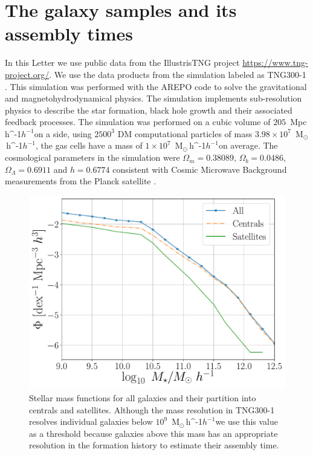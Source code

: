 \documentclass[fleqn,usenatbib]{mnras}
\newcommand{\Msunh}{\,{\rm M}$_{\odot}$\,\ifmmode h^{-1}\else $h^{-1}$\fi}
\newcommand{\Mpch}{\,{\rm Mpc}\,\ifmmode h^{-1}\else $h^{-1}$\fi}
\begin{document}
\section{The galaxy samples and its assembly times}
\label{sec:simul} 

In this Letter we use public data from the IllustrisTNG project
\url{https://www.tng-project.org/}. 
We use the data products from the simulation labeled as TNG300-1 
\citep{2019ComAC...6....2N}.
This simulation was performed with the AREPO code
\citep{2010MNRAS.401..791S} to solve the 
gravitational and magnetohydrodynamical physics. 
The simulation implements sub-resolution physics to describe the
star formation, black hole growth and their associated feedback
processes. 
The simulation was performed on a cubic volume of $205$ \Mpch on a
side, using  $2500^3$ DM computational particles of mass $3.98 \times
10^7$ \Msunh, the gas cells have a mass of $1 \times 10^7$ \Msunh on
average.
The cosmological parameters in the simulation were $\Omega_m=0.38089$,
$\Omega_b=0.0486$, $\Omega_\Lambda= 0.6911$ and $h=0.6774$ consistent
with Cosmic Microwave Background measurements from the Planck satellite
\citep{2016A&A...594A..13P}.  


\begin{figure}
    \centering
    \includegraphics[width=1\columnwidth]{figuras/Histogramas.pdf}
    \caption{Stellar mass functions for all galaxies and their partition
      into centrals and satellites. 
    Although the mass resolution in TNG300-1 resolves individual
    galaxies below $10^{9}$ \Msunh we use this value as a threshold
    because galaxies above this mass has an appropriate resolution in
    the formation history to estimate their assembly time.}
    \label{fig:stellar_fuction}
\end{figure}
\end{document}
